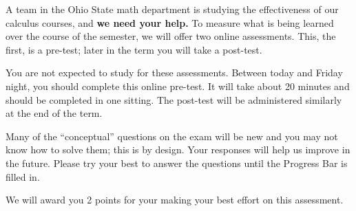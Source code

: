 \documentclass{ximera}
\begin{document}
A team in the Ohio State math department is studying the effectiveness
of our calculus courses, and \textbf{we need your help.}  To measure
what is being learned over the course of the semester, we will offer
two online assessments.  This, the first, is a pre-test; later in the
term you will take a post-test.

You are not expected to study for these assessments.  Between today
and Friday night, you should complete this online pre-test.  It will
take about 20 minutes and should be completed in one sitting.  The
post-test will be administered similarly at the end of the term.

Many of the ``conceptual'' questions on the exam will be new and you
may not know how to solve them; this is by design.  Your responses
will help us improve in the future.  Please try your best to answer
the questions until the Progress Bar is filled in.

We will award you 2 points for your making your best effort on this
assessment.
\end{document}
